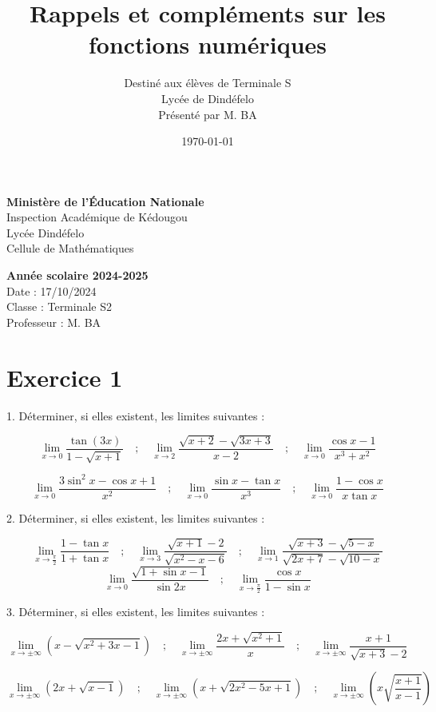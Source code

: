 \documentclass[12pt]{article}
\author{Destiné aux élèves de Terminale S\\Lycée de Dindéfelo\\Présenté par M. BA}
\title{\textbf{Rappels et compléments sur les fonctions numériques}}
\date{\today}
\begin{document}
\noindent
\begin{minipage}[t]{0.48\textwidth}
\raggedright
\textbf{Ministère de l'Éducation Nationale}\\
Inspection Académique de Kédougou\\
Lycée Dindéfelo\\
Cellule de Mathématiques
\end{minipage}
\hfill
\begin{minipage}[t]{0.48\textwidth}
\raggedleft
\textbf{Année scolaire 2024-2025}\\
Date : 17/10/2024\\
Classe : Terminale S2\\
Professeur : M. BA
\end{minipage}

\vspace{1cm}
\section*{Exercice 1}

1. Déterminer, si elles existent, les limites suivantes :

\[
\lim_{x \to 0} \frac{\tan(3x)}{1 - \sqrt{x + 1}} \quad ; \quad \lim_{x \to 2} \frac{\sqrt{x+2} - \sqrt{3x+3}}{x-2} \quad ; \quad \lim_{x \to 0} \frac{\cos x - 1}{x^3 + x^2}
\]

\[
\lim_{x \to 0} \frac{3 \sin^2 x - \cos x + 1}{x^2} \quad ; \quad \lim_{x \to 0} \frac{\sin x - \tan x}{x^3}\quad ; \quad\lim_{x \to 0} \frac{1 - \cos x}{x \tan x}
\]

2. Déterminer, si elles existent, les limites suivantes :

\[
\lim_{x \to \frac{\pi}{2}} \frac{1 - \tan x}{1 + \tan x}\quad ; \quad \lim_{x \to 3} \frac{\sqrt{x+1} - 2}{\sqrt{x^2 - x - 6}}\quad ; \quad\lim_{x \to 1} \frac{\sqrt{x+3} - \sqrt{5-x}}{\sqrt{2x+7} - \sqrt{10-x}}
\]
\[
\lim_{x \to 0} \frac{\sqrt{1+\sin x -1}}{\sin 2x}\quad ; \quad\lim_{x \to \frac{\pi}{2}} \frac{\cos x}{1-\sin x}
\]

3. Déterminer, si elles existent, les limites suivantes :

\[
\lim_{x \to \pm \infty} \left(x - \sqrt{x^2 + 3x - 1}\right)\quad; \quad \lim_{x \to \pm \infty} \frac{2x + \sqrt{x^2 + 1}}{x}\quad; \quad
\lim_{x \to \pm \infty} \frac{x+1}{\sqrt{x+3}-2}
\]

\[
\lim_{x \to \pm \infty} \left(2x + \sqrt{x - 1}\right)\quad; \quad
\lim_{x \to \pm \infty} \left(x + \sqrt{2x^{2} - 5x + 1 }\right)\quad; \quad
\lim_{x \to \pm \infty} \left(x\sqrt{\frac{x+1}{x-1}}\right)
\]
\end{document}
